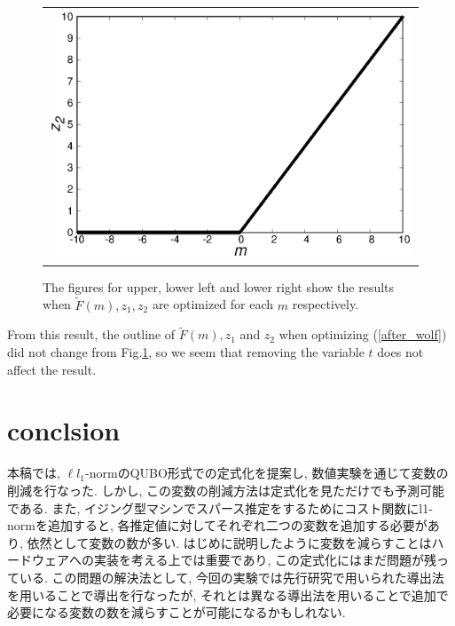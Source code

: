 \documentclass[fp,twocolumn]{jpsj3}
\begin{document}
\begin{figure}[htbp]
\begin{center}
\begin{tabular}{c}
\begin{minipage}{0.50\hsize}
        \includegraphics[keepaspectratio,scale=0.33]{minimum_z2_non_t.eps}
      \end{minipage}
    \end{tabular}
    \caption{The figures for upper, lower left and lower right show the results when $\widetilde{F}(m), z_{1}, z_{2}$ are optimized for each $m$ respectively.}
    \label{fig:minimum2}
  \end{center}
\end{figure}
From this result, the outline of $\widetilde{F}(m), z_{1}$ and $z_{2}$ when optimizing (\ref{after_wolf}) did not change from Fig.\ref{fig:minimum2}, so we seem that removing the variable $t$ does not affect the result.


\section{conclsion}
本稿では, $\ell{l}_{1}$-normのQUBO形式での定式化を提案し, 数値実験を通じて変数の削減を行なった. しかし, この変数の削減方法は定式化を見ただけでも予測可能である. また, イジング型マシンでスパース推定をするためにコスト関数にl1-normを追加すると, 各推定値に対してそれぞれ二つの変数を追加する必要があり, 依然として変数の数が多い. はじめに説明したように変数を減らすことはハードウェアへの実装を考える上では重要であり, この定式化にはまだ問題が残っている. この問題の解決法として, 今回の実験では先行研究で用いられた導出法を用いることで導出を行なったが, それとは異なる導出法を用いることで追加で必要になる変数の数を減らすことが可能になるかもしれない. 


\begin{acknowledgment}



\end{acknowledgment}
\end{document}

